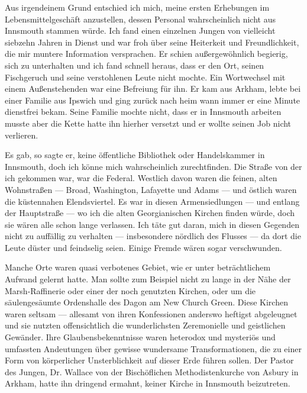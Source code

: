 Aus irgendeinem Grund entschied ich mich, meine ersten Erhebungen im Lebensmittelgeschäft anzustellen, dessen Personal wahrscheinlich nicht aus Innsmouth stammen würde. Ich fand einen einzelnen Jungen von vielleicht siebzehn Jahren in Dienst und war froh über seine Heiterkeit und Freundlichkeit, die mir muntere Information versprachen. Er schien außergewöhnlich begierig, sich zu unterhalten und ich fand schnell heraus, dass er den Ort, seinen Fischgeruch und seine verstohlenen Leute nicht mochte. Ein Wortwechsel mit einem Außenstehenden war eine Befreiung für ihn. Er kam aus Arkham, lebte bei einer Familie aus Ipswich und ging zurück nach heim wann immer er eine Minute dienstfrei bekam. Seine Familie mochte nicht, dass er in Innsmouth arbeiten musste aber die Kette hatte ihn hierher versetzt und er wollte seinen Job nicht verlieren.

Es gab, so sagte er, keine öffentliche Bibliothek oder Handelskammer in Innsmouth, doch ich könne mich wahrscheinlich zurechtfinden. Die Straße von der ich gekommen war, war die Federal. Westlich davon waren die feinen, alten Wohnstraßen --- Broad, Washington, Lafayette und Adams --- und östlich waren die küstennahen Elendsviertel. Es war in diesen Armensiedlungen --- und entlang der Hauptstraße --- wo ich die alten Georgianischen Kirchen finden würde, doch sie wären alle schon lange verlassen. Ich täte gut daran, mich in diesen Gegenden nicht zu auffällig zu verhalten --- insbesondere nördlich des Flusses --- da dort die Leute düster und feindselig seien. Einige Fremde wären sogar verschwunden.

Manche Orte waren quasi verbotenes Gebiet, wie er unter beträchtlichem Aufwand gelernt hatte. Man sollte zum Beispiel nicht zu lange in der Nähe der Marsh-Raffinerie oder einer der noch genutzten Kirchen, oder um die säulengesäumte Ordenshalle des Dagon am New Church Green. Diese Kirchen waren seltsam --- allesamt von ihren Konfessionen anderswo heftigst abgeleugnet und sie nutzten offensichtlich die wunderlichsten Zeremonielle und geistlichen Gewänder. Ihre Glaubensbekenntnisse waren heterodox und mysteriös und umfassten Andeutungen über gewisse wundersame Transformationen, die zu einer Form von körperlicher Unsterblichkeit auf dieser Erde führen sollen. Der Pastor des Jungen, Dr. Wallace von der Bischöflichen Methodistenkurche von Asbury in Arkham, hatte ihn dringend ermahnt, keiner Kirche in Innsmouth beizutreten.

